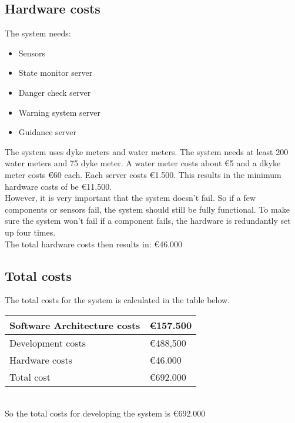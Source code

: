 \subsection{Hardware costs}
The system needs:
\begin{itemize}
	\item Sensors
	\item {State monitor server}
	\item {Danger check server}	
	\item {Warning system server}	
	\item {Guidance server}	
\end{itemize}
The system uses dyke meters and water meters. The system needs at least 200 water meters and 75 dyke meter. A water meter costs about \euro{}5 and a dkyke meter costs \euro{}60 each. Each server costs \euro{}1.500. This results in the minimum hardware costs of be \euro{}11,500. \\
 However, it is very important that the system doesn't fail. So if a few components or sensors fail, the system should still be fully functional. To make sure the system won't fail if a component fails, the hardware is redundantly set up four times.\\
 The total hardware costs then results in: \euro{}46.000

\subsection{Total costs}
The total costs for the system is calculated in the table below.\\
\newline
\begin{tabular}{|L{}|L{}|}
	\toprule
	Software Architecture costs & \euro{}157.500\\ \midrule
	Development costs & \euro{}{}488,500\\ \midrule
	Hardware costs & \euro{}46.000\\ \midrule
	Total cost & \euro{}692.000\\
	\bottomrule
\end{tabular}\\
\newline
So the total costs for developing the system is \euro{}692.000\\

